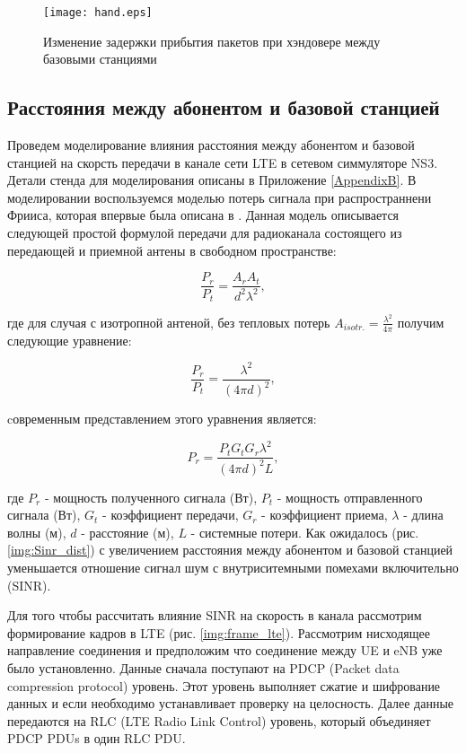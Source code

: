\begin{figure} [h]
  \center
\texttt{[image: hand.eps]}
  \caption{Изменение задержки прибытия пакетов при хэндовере между базовыми станциями}
  \label{img:hand}
\end{figure}

\subsection{Расстояния между абонентом и базовой станцией}  \label{sect2_2_2}
Проведем моделирование влияния расстояния между абонентом и базовой станцией на скорсть передачи в канале сети LTE в сетевом симмуляторе NS3. Детали стенда для моделирования описаны в Приложение \ref{AppendixB}. В моделировании воспользуемся моделью потерь сигнала при распространнени Фрииса, которая впервые была описана в \cite{Friis}. Данная модель описывается следующей простой формулой передачи для радиоканала состоящего из передающей и приемной антены в свободном пространстве:

\begin{equation}\label{eq:friisMod1}
\frac{P_{r}}{P_{t}}=\frac{A_{r}A_{t}}{d^{2}\lambda^{2}},
\end{equation}

\noindent где для случая с изотропной антеной, без тепловых потерь $A_{isotr.}=\frac{\lambda^{2}}{4\pi}$ получим следующие уравнение:

\begin{equation}\label{eq:friisMod2}
\frac{P_{r}}{P_{t}}=\frac{\lambda^{2}}{(4\pi d)^{2}},
\end{equation}

\noindent cовременным представлением этого уравнения является:

\begin{equation}\label{eq:friisNew}
P_{r}=\frac{P_{t}G_{t}G_{r}\lambda^{2}}{(4\pi d)^{2}L},
\end{equation}

\noindent где $P_{r}$ - мощность полученного сигнала (Вт), $P_{t}$ - мощность отправленного сигнала (Вт), $G_{t}$ - коэффициент передачи, $G_{r}$ - коэффициент приема, $\lambda$ - длина волны (м), $d$ - расстояние (м), $L$ - системные потери. Как ожидалось (рис. \ref{img:Sinr_dist}) с увеличением расстояния между абонентом и базовой станцией уменьшается отношение сигнал шум с внутриситемными помехами включительно (SINR).

Для того чтобы рассчитать влияние SINR на скорость в канала рассмотрим формирование кадров в LTE (рис. \ref{img:frame_lte}). Рассмотрим нисходящее направление соединения и предположим что соединение между UE и eNB уже было установленно. Данные сначала поступают на PDCP (Packet data compression protocol) уровень. Этот уровень выполняет сжатие и шифрование данных и если необходимо устанавливает проверку на целосность. Далее данные передаются на RLC (LTE Radio Link Control) уровень, который объединяет PDCP PDUs в один RLC PDU.

